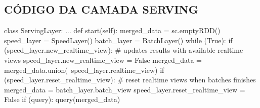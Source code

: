 \begin{apendicesenv}
\section{CÓDIGO DA CAMADA SERVING}
\begin{python}
class ServingLayer:
    ...
    def start(self):
        merged_data = sc.emptyRDD()
        speed_layer = SpeedLayer()
        batch_layer = BatchLayer()
        while (True):
            if (speed_layer.new_realtime_view):
                # updates results with available realtime views
                speed_layer.new_realtime_view = False
                merged_data = merged_data.union(\
                    speed_layer.realtime_view)
            if (speed_layer.reset_realtime_view):
                # reset realtime views when batches finishes
                merged_data = batch_layer.batch_view
                speed_layer.reset_realtime_view = False
            if (query):
                query(merged_data)
\end{python}

\end{apendicesenv}

